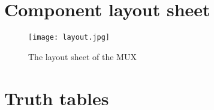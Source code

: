 \documentclass[11pt]{article}
\begin{document}
\section{Component layout sheet}
\begin{figure}[h]
    \centering
    \texttt{[image: layout.jpg]}
    \caption{The layout sheet of the MUX}
    \label{layout}
\end{figure}

\section{Truth tables}
\end{document}
